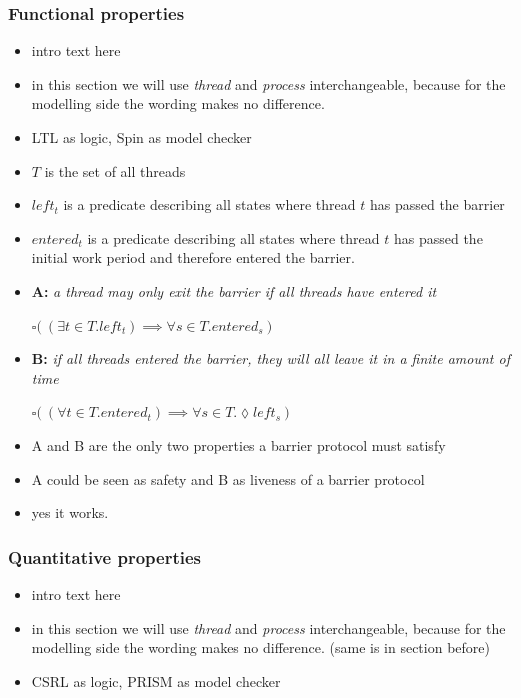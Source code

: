 \documentclass[a4paper, 10pt]{article}
\begin{document}
\subsubsection{Functional properties}
\label{sssec:analysis-modelchecking-functional-properties}
\begin{itemize}
	\item intro text here
	\item in this section we will use \emph{thread} and \emph{process} interchangeable, because for the modelling side the wording makes no difference.
	\item LTL as logic, Spin as model checker
	\item $T$ is the set of all threads
	\item $\mathit{left_t}$ is a predicate describing all states where thread $t$ has passed the barrier
	\item $entered_t$ is a predicate describing all states where thread $t$ has passed the initial work period and therefore entered the barrier.
	\item \textbf{A:} \emph{a thread may only exit the barrier if all threads have entered it}
		\begin{center}
			$\square \big( ~ ( \exists t \in T . \mathit{left_t} ) \implies \forall s \in T. \mathit{entered_s} ~ \big)$
		\end{center}
	\item \textbf{B:} \emph{if all threads entered the barrier, they will all leave it in a finite amount of time}
		\begin{center}
			$\square \big( ~(\forall t \in T . \mathit{entered_t} ) \implies \forall s \in T. \lozenge \mathit{left_s} ~ \big)$
		\end{center}
	\item A and B are the only two properties a barrier protocol must satisfy
	\item A could be seen as safety and B as liveness of a barrier protocol
	\item yes it works.
\end{itemize}

\subsubsection{Quantitative properties}
\label{sssec:analysis-modelchecking-quantitative-properties}
\begin{itemize}
	\item intro text here
	\item in this section we will use \emph{thread} and \emph{process} interchangeable, because for the modelling side the wording makes no difference. (same is in section before)
	\item CSRL as logic, PRISM as model checker
\end{itemize}
\end{document}
